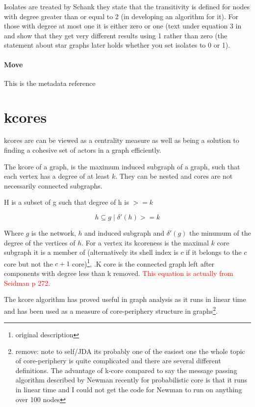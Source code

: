 Isolates are treated by Schank\cite{schank2005approximating} they state that the transitivity is defined for nodes with degree greater than or equal to 2 (in developing an algorithm for it). For those with degree at most one it is either zero or one (text under equation 3 in \cite{schank2005approximating} and show that they get very different results using 1 rather than zero (the statement about star graphs later holds whether you set isolates to 0 or 1). 
\paragraph{Move}
This is the metadata reference \cite{newman2016structure}

\section{kcores}

kcores are can be viewed as a centrality measure as well as being a solution to finding a cohesive set of actors in a graph efficiently.

The kcore of a graph, is the maximum induced subgraph of a graph, such that each vertex has a degree of at least $k$. They can be nested and cores are not necessarily connected subgraphs\cite{batagelj2003m}. 

H is a subset of g such that degree of h is $>=k$

\begin{equation}
h \subseteq g \mid \delta'(h)>=k
\end{equation}

Where $g$ is the network, $h$ and induced subgraph and  $\delta'(g)$ the minumum of the degree of the vertices of $h$.
For a vertex its kcoreness is the maximal $k$ core subgraph it is a member of (alternatively its shell index is $c$ if it belongs to the $c$ core but not the $c+1$ core)\cite{seidman1983network}\footnote{original description}, \cite{alvarez2006large}.K core is the connected graph left after components with degree less than k removed.  \textcolor{red}{This equation is actually from Seidman p 272}\cite{seidman1983network}.

The kcore algorithm has proved useful in graph analysis as it runs in linear time and has been used as a measure of core-periphery structure in graphs\cite{newman2018networks}\footnote{remove: note to self/JDA its probably one of the easiest one the whole topic of core-periphery is quite complicated and there are several different definitions. The advantage of k-core compared to say the message passing algorithm described by Newman recently for probabilistic core is that it runs in linear time and I could not get the code for Newman to run on anything over 100 nodes}.

